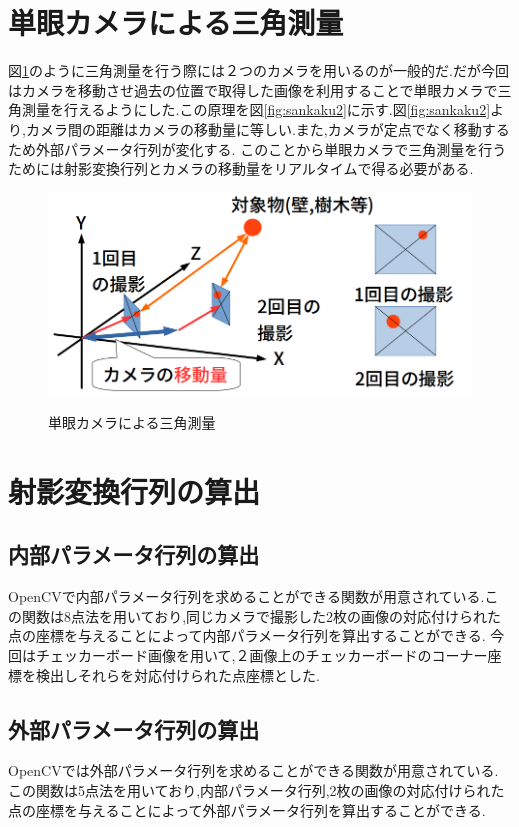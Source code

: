 \documentclass[12pt,oneside]{sotsuken_paper}
\begin{document}
\section{単眼カメラによる三角測量}
図\ref{fig:sankaku1}のように三角測量を行う際には２つのカメラを用いるのが一般的だ.だが今回はカメラを移動させ過去の位置で取得した画像を利用することで単眼カメラで三角測量を行えるようにした.この原理を図\ref{fig:sankaku2}に示す.図\ref{fig:sankaku2}より,カメラ間の距離はカメラの移動量に等しい.また,カメラが定点でなく移動するため外部パラメータ行列が変化する.
このことから単眼カメラで三角測量を行うためには射影変換行列とカメラの移動量をリアルタイムで得る必要がある.

\begin{figure}[htp]
 \begin{center}
  \includegraphics[width=120mm]{img/soft/sankaku1.png}
 　\caption{単眼カメラによる三角測量}
  \label{fig:sankaku1}%
 \end{center}
\end{figure}

\section{射影変換行列の算出}
\subsection{内部パラメータ行列の算出}
OpenCVで内部パラメータ行列を求めることができる関数が用意されている.この関数は8点法\cite{fivepoint}を用いており,同じカメラで撮影した2枚の画像の対応付けられた点の座標を与えることによって内部パラメータ行列を算出することができる.
今回はチェッカーボード画像を用いて,２画像上のチェッカーボードのコーナー座標を検出しそれらを対応付けられた点座標とした.
\subsection{外部パラメータ行列の算出}
OpenCVでは外部パラメータ行列を求めることができる関数が用意されている.この関数は5点法\cite{fivepoint}を用いており,内部パラメータ行列,2枚の画像の対応付けられた点の座標を与えることによって外部パラメータ行列を算出することができる.
\end{document}
